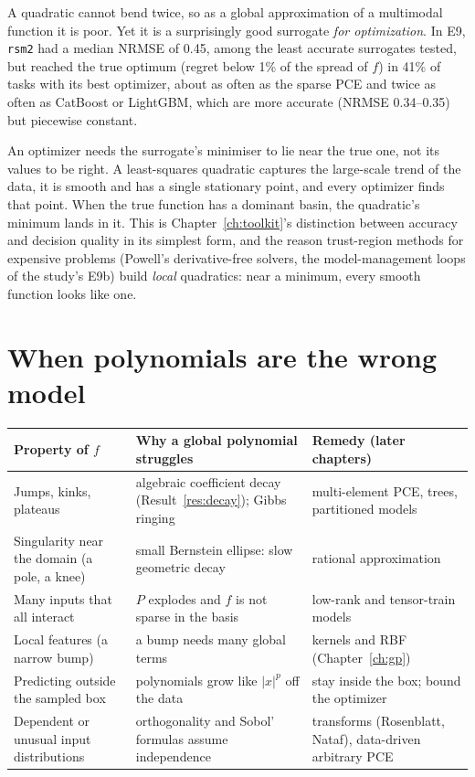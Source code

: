 A quadratic cannot bend twice, so as a global approximation of a multimodal function it is poor. Yet it is a
surprisingly good surrogate \emph{for optimization}. In E9, \texttt{rsm2} had a median NRMSE of 0.45, among the
least accurate surrogates tested, but reached the true optimum (regret below 1\% of the spread of $f$) in 41\% of
tasks with its best optimizer, about as often as the sparse PCE and twice as often as CatBoost or LightGBM, which are
more accurate (NRMSE 0.34--0.35) but piecewise constant.

\begin{intuition}
An optimizer needs the surrogate's minimiser to lie near the true one, not its values to be right. A least-squares
quadratic captures the large-scale trend of the data, it is smooth and has a single stationary point, and every
optimizer finds that point. When the true function has a dominant basin, the quadratic's minimum lands in it. This
is Chapter~\ref{ch:toolkit}'s distinction between accuracy and decision quality in its simplest form, and the
reason trust-region methods for expensive problems (Powell's derivative-free solvers, the model-management loops of
the study's E9b) build \emph{local} quadratics: near a minimum, every smooth function looks like one.
\end{intuition}

\section{When polynomials are the wrong model}

\begin{center}
\small
\begin{tabular}{p{4.1cm}p{5.3cm}p{4.2cm}}
\toprule
Property of $f$ & Why a global polynomial struggles & Remedy (later chapters) \\
\midrule
Jumps, kinks, plateaus & algebraic coefficient decay (Result~\ref{res:decay}); Gibbs ringing & multi-element PCE,
trees, partitioned models \\
Singularity near the domain (a pole, a knee) & small Bernstein ellipse: slow geometric decay & rational
approximation \\
Many inputs that all interact & $P$ explodes and $f$ is not sparse in the basis & low-rank and tensor-train models \\
Local features (a narrow bump) & a bump needs many global terms & kernels and RBF (Chapter~\ref{ch:gp}) \\
Predicting outside the sampled box & polynomials grow like $|x|^p$ off the data & stay inside the box; bound the
optimizer \\
Dependent or unusual input distributions & orthogonality and Sobol' formulas assume independence & transforms
(Rosenblatt, Nataf), data-driven arbitrary PCE \\
\bottomrule
\end{tabular}
\end{center}

